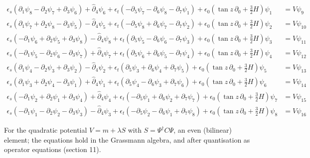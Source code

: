 \documentclass[11pt]{article}
\begin{document}
\[
\begin{aligned}
\epsilon_s(\partial_1\psi_{8} - \partial_2\psi_{7} + \partial_3\psi_{6}) + \hat\partial_4\psi_{6} + \epsilon_t(-\partial_5\psi_{7} - \partial_6\psi_{8} - \partial_7\psi_{1}) + \epsilon_0(\tan z\,\partial_0 + \tfrac32H)\psi_{1} &= V\psi_{9} \\
\epsilon_s(\partial_1\psi_{7} + \partial_2\psi_{8} - \partial_3\psi_{5}) - \hat\partial_4\psi_{5} + \epsilon_t(-\partial_5\psi_{8} + \partial_6\psi_{7} - \partial_7\psi_{2}) + \epsilon_0(\tan z\,\partial_0 + \tfrac32H)\psi_{2} &= V\psi_{10} \\
\epsilon_s(-\partial_1\psi_{6} + \partial_2\psi_{5} + \partial_3\psi_{8}) - \hat\partial_4\psi_{8} + \epsilon_t(\partial_5\psi_{5} - \partial_6\psi_{6} - \partial_7\psi_{3}) + \epsilon_0(\tan z\,\partial_0 + \tfrac32H)\psi_{3} &= V\psi_{11} \\
\epsilon_s(-\partial_1\psi_{5} - \partial_2\psi_{6} - \partial_3\psi_{7}) + \hat\partial_4\psi_{7} + \epsilon_t(\partial_5\psi_{6} + \partial_6\psi_{5} - \partial_7\psi_{4}) + \epsilon_0(\tan z\,\partial_0 + \tfrac32H)\psi_{4} &= V\psi_{12} \\
\epsilon_s(\partial_1\psi_{4} - \partial_2\psi_{3} + \partial_3\psi_{2}) - \hat\partial_4\psi_{2} + \epsilon_t(\partial_5\psi_{3} + \partial_6\psi_{4} + \partial_7\psi_{5}) + \epsilon_0(\tan z\,\partial_0 + \tfrac32H)\psi_{5} &= V\psi_{13} \\
\epsilon_s(\partial_1\psi_{3} + \partial_2\psi_{4} - \partial_3\psi_{1}) + \hat\partial_4\psi_{1} + \epsilon_t(\partial_5\psi_{4} - \partial_6\psi_{3} + \partial_7\psi_{6}) + \epsilon_0(\tan z\,\partial_0 + \tfrac32H)\psi_{6} &= V\psi_{14} \\
\epsilon_s(-\partial_1\psi_{2} + \partial_2\psi_{1} + \partial_3\psi_{4}) + \hat\partial_4\psi_{4} + \epsilon_t(-\partial_5\psi_{1} + \partial_6\psi_{2} + \partial_7\psi_{7}) + \epsilon_0(\tan z\,\partial_0 + \tfrac32H)\psi_{7} &= V\psi_{15} \\
\epsilon_s(-\partial_1\psi_{1} - \partial_2\psi_{2} - \partial_3\psi_{3}) - \hat\partial_4\psi_{3} + \epsilon_t(-\partial_5\psi_{2} - \partial_6\psi_{1} + \partial_7\psi_{8}) + \epsilon_0(\tan z\,\partial_0 + \tfrac32H)\psi_{8} &= V\psi_{16}
\end{aligned}
\]

For the quadratic potential $V = m + \lambda S$ with $S = \Psi^\dagger C\Psi$, an even (bilinear) element; the equations hold in the Grassmann algebra, and after quantisation as operator equations (section 11).
\end{document}
